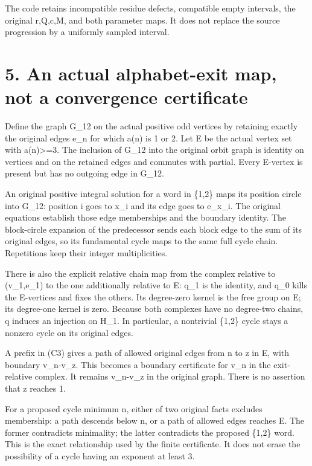 
The code retains incompatible residue defects, compatible empty
intervals, the original r,Q,c,M, and both parameter maps. It does not
replace the source progression by a uniformly sampled interval.

\section{5. An actual alphabet-exit map, not a convergence certificate}

Define the graph G\_12 on the actual positive odd vertices by retaining
exactly the original edges e\_n for which a(n) is 1 or 2. Let E be the
actual vertex set with a(n)\textgreater=3. The inclusion of G\_12 into
the original orbit graph is identity on vertices and on the retained
edges and commutes with partial. Every E-vertex is present but has no
outgoing edge in G\_12.

An original positive integral solution for a word in \{1,2\} maps its
position circle into G\_12: position i goes to x\_i and its edge goes to
e\_x\_i. The original equations establish those edge memberships and the
boundary identity. The block-circle expansion of the predecessor sends
each block edge to the sum of its original edges, so its fundamental
cycle maps to the same full cycle chain. Repetitions keep their integer
multiplicities.

There is also the explicit relative chain map from the complex relative
to (v\_1,e\_1) to the one additionally relative to E: q\_1 is the
identity, and q\_0 kills the E-vertices and fixes the others. Its
degree-zero kernel is the free group on E; its degree-one kernel is
zero. Because both complexes have no degree-two chains, q induces an
injection on H\_1. In particular, a nontrivial \{1,2\} cycle stays a
nonzero cycle on its original edges.

A prefix in (C3) gives a path of allowed original edges from n to z in
E, with boundary v\_n-v\_z. This becomes a boundary certificate for v\_n
in the exit-relative complex. It remains v\_n-v\_z in the original
graph. There is no assertion that z reaches 1.

For a proposed cycle minimum n, either of two original facts excludes
membership: a path descends below n, or a path of allowed edges reaches
E. The former contradicts minimality; the latter contradicts the
proposed \{1,2\} word. This is the exact relationship used by the finite
certificate. It does not erase the possibility of a cycle having an
exponent at least 3.


